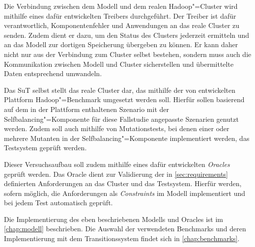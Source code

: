 Die Verbindung zwischen dem Modell und dem realen Hadoop"=Cluster wird mithilfe eines dafür entwickelten Treibers durchgeführt.
Der Treiber ist dafür verantwortlich, Komponentenfehler und Anwendungen an das reale Cluster zu senden.
Zudem dient er dazu, um den Status des Clusters jederzeit ermitteln und an das Modell zur dortigen Speicherung übergeben zu können.
Er kann daher nicht nur aus der Verbindung zum Cluster selbst bestehen, sondern muss auch die Kommunikation zwischen Modell und Cluster sicherstellen und übermittelte Daten entsprechend umwandeln.

Das \ac{SuT} selbst stellt das reale Cluster dar, das mithilfe der von \citeauthor{zhang2016} entwickelten Plattform Hadoop"=Benchmark umgesetzt werden soll.
Hierfür sollen basierend auf dem in der Plattform enthaltenen Szenario mit der Selfbalancing"=Komponente für diese Fallstudie angepasste Szenarien genutzt werden.
Zudem soll auch mithilfe von Mutationstests, bei denen einer oder mehrere Mutanten in der Selfbalancing"=Komponente implementiert werden, das Testsystem geprüft werden.

Dieser Versuchsaufbau soll zudem mithilfe eines dafür entwickelten \emph{Oracles} geprüft werden.
Das Oracle dient zur Validierung der in \autoref{sec:requirements} definierten Anforderungen an das Cluster und das Testsystem.
Hierfür werden, sofern möglich, die Anforderungen als \emph{Constraints} im Modell implementiert und bei jedem Test automatisch geprüft.

Die Implementierung des eben beschriebenen Modells und Oracles ist im \autoref{chap:modell} beschrieben.
Die Auswahl der verwendeten Benchmarks und deren Implementierung mit dem Transitionssystem findet sich in \autoref{chap:benchmarks}.
